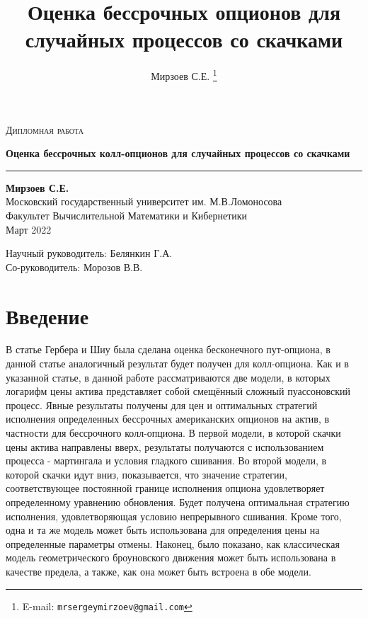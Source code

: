 \documentclass[a4paper,12pt]{article}
\author{Мирзоев С.Е.%
\thanks{E-mail: \texttt{mrsergeymirzoev@gmail.com}}}
\title{Оценка бессрочных опционов для случайных процессов со скачками}
\affil{Факультет Вычислительной Математики и Кибернетики, Московский государственный университет им. М.В.Ломоносова}
\theoremstyle{definition}
\begin{document}
\begin{titlepage}
\centering

\textsc{Дипломная работа}


{\LARGE\bfseries Оценка бессрочных колл-опционов для случайных процессов со скачками\\}
\rule{3in}{0.4pt}


\textbf{Мирзоев С.Е.}\\
Московский государственный университет им. М.В.Ломоносова\\
Факультет Вычислительной Математики и Кибернетики\\
Март 2022


{\small
Научный руководитель: Белянкин Г.А.\\
Со-руководитель: Морозов В.В.}


\end{titlepage}
\thispagestyle{empty}

\newpage
\tableofcontents

\newpage

\section{Введение}

В статье Гербера и Шиу была сделана оценка бесконечного пут-опциона, в данной статье аналогичный результат будет получен для колл-опциона. Как и в указанной статье, в данной работе рассматриваются две модели, в которых логарифм цены актива представляет собой смещённый сложный пуассоновский процесс. Явные результаты получены для цен и оптимальных стратегий исполнения определенных бессрочных американских опционов на актив, в частности для бессрочного колл-опциона. В первой модели, в которой скачки цены актива направлены вверх, результаты получаются с использованием процесса - мартингала и условия гладкого сшивания. Во второй модели, в которой скачки идут вниз, показывается, что значение стратегии, соответствующее постоянной границе исполнения опциона удовлетворяет определенному уравнению обновления. Будет получена оптимальная стратегию исполнения, удовлетворяющая условию непрерывного сшивания. Кроме того, одна и та же модель может быть использована для определения цены на определенные параметры отмены. Наконец, было показано, как классическая модель геометрического броуновского движения может быть использована в качестве предела, а также, как она может быть встроена в обе модели.
\end{document}
